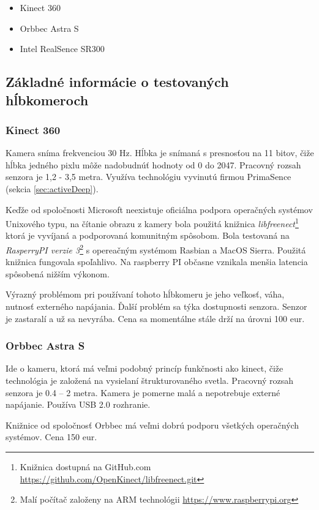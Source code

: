 \begin{itemize}
\item Kinect 360
\item Orbbec Astra S
\item Intel RealSence SR300

\end{itemize}


\subsection{Základné informácie o testovaných hĺbkomeroch}
\subsubsection{Kinect 360}
Kamera sníma frekvenciou 30 Hz. Hĺbka je snímaná s presnosťou na 11 bitov, čiže hĺbka jedného pixlu môže nadobudnúť hodnoty od 0 do 2047.  Pracovný rozsah senzora je  1,2 - 3,5 metra.  Využíva technológiu vyvinutú firmou PrimaSence (sekcia \ref{sec:activeDeep}).

Keďže od spoločnosti Microsoft neexistuje oficiálna podpora operačných systémov Unixového typu, na čítanie obrazu z kamery bola použitá knižnica \textit{libfreenect}\footnote{Knižnica dostupná na GitHub.com \url{https://github.com/OpenKinect/libfreenect.git}} ktorá je vyvíjaná a podporovaná komunitným spôsobom. Bola testovaná na \textit{RasperryPI verzie 3}\footnote{Malí počítač založeny na ARM technológii \url{https://www.raspberrypi.org}} s opereačným systémom Rasbian a MacOS Sierra. Použitá knižnica fungovala spoľahlivo. Na raspberry PI občasne vznikala menšia latencia spôsobená nižším výkonom.  

Výrazný problémom pri používaní tohoto hĺbkomeru je jeho veľkosť, váha, nutnosť externého napájania. Ďalší problém sa týka dostupnosti senzora. Senzor je zastaralí a už sa nevyrába. Cena sa momentálne stále drží na úrovni 100 eur. 

\subsubsection{Orbbec Astra S}
Ide o kameru, ktorá má veľmi podobný princíp funkčnosti ako kinect, čiže technológia je založená na vysielaní štrukturovaného svetla. Pracovný rozsah senzora je 0.4 – 2 metra. Kamera je pomerne malá a nepotrebuje externé napájanie. Používa USB 2.0 rozhranie. 

Knižnice od spoločnosť Orbbec má veľmi dobrú podporu všetkých operačných systémov. Cena 150 eur. 


